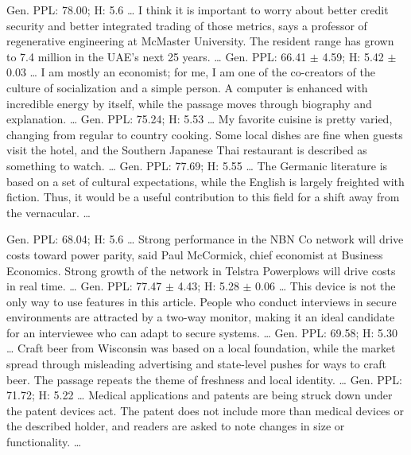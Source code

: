 \begin{tcolorbox}
{\textcolor{owtgreen}{Gen. PPL:} 78.00; \textcolor{owtgreen}{H:} 5.6}
{\ldots{} I think it is important to worry about better credit security and better integrated trading of those metrics, says a professor of regenerative engineering at McMaster University. The resident range has grown to 7.4 million in the UAE's next 25 years. \ldots{}}
\qualrowsep
{}
{\textcolor{owtgreen}{Gen. PPL:} 66.41 $\pm$ 4.59; \textcolor{owtgreen}{H:} 5.42 $\pm$ 0.03}
{\ldots{} I am mostly an economist; for me, I am one of the co-creators of the culture of socialization and a simple person. A computer is enhanced with incredible energy by itself, while the passage moves through biography and explanation. \ldots{}}
\qualrowsep
{}
{\textcolor{owtgreen}{Gen. PPL:} 75.24; \textcolor{owtgreen}{H:} 5.53}
{\ldots{} My favorite cuisine is pretty varied, changing from regular to country cooking. Some local dishes are fine when guests visit the hotel, and the Southern Japanese Thai restaurant is described as something to watch. \ldots{}}
\qualrowsep
{}
{\textcolor{owtgreen}{Gen. PPL:} 77.69; \textcolor{owtgreen}{H:} 5.55}
{\ldots{} The Germanic literature is based on a set of cultural expectations, while the English is largely freighted with fiction. Thus, it would be a useful contribution to this field for a shift away from the vernacular. \ldots{}}

{\textcolor{owtgreen}{Gen. PPL:} 68.04; \textcolor{owtgreen}{H:} 5.6}
{\ldots{} Strong performance in the NBN Co network will drive costs toward power parity, said Paul McCormick, chief economist at Business Economics. Strong growth of the network in Telstra Powerplows will drive costs in real time. \ldots{}}
\qualrowsep
{}
{\textcolor{owtgreen}{Gen. PPL:} 77.47 $\pm$ 4.43; \textcolor{owtgreen}{H:} 5.28 $\pm$ 0.06}
{\ldots{} This device is not the only way to use features in this article. People who conduct interviews in secure environments are attracted by a two-way monitor, making it an ideal candidate for an interviewee who can adapt to secure systems. \ldots{}}
\qualrowsep
{}
{\textcolor{owtgreen}{Gen. PPL:} 69.58; \textcolor{owtgreen}{H:} 5.30}
{\ldots{} Craft beer from Wisconsin was based on a local foundation, while the market spread through misleading advertising and state-level pushes for ways to craft beer. The passage repeats the theme of freshness and local identity. \ldots{}}
\qualrowsep
{}
{\textcolor{owtgreen}{Gen. PPL:} 71.72; \textcolor{owtgreen}{H:} 5.22}
{\ldots{} Medical applications and patents are being struck down under the patent devices act. The patent does not include more than medical devices or the described holder, and readers are asked to note changes in size or functionality. \ldots{}}
\end{tcolorbox}

